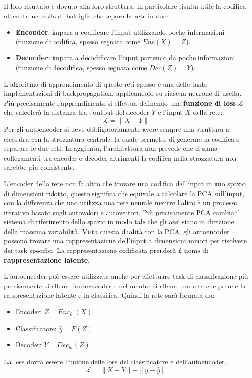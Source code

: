 Il loro risultato è dovuto alla loro struttura, in particolare risulta utile la
codifica ottenuta nel collo di bottiglia che separa la rete in due:
\begin{itemize}
      \item \textbf{Enconder}: impara a codificare l'input utilizzando poche
            informazioni (funzione di codifica, spesso segnata come $Enc(X) = Z$).
      \item \textbf{Deconder}: impara a decodificare l'input partendo da poche
            informazioni (funzione di decodifica, spesso segnata come $Dec(Z) = Y$).
\end{itemize}
L'algoritmo di apprendimento di queste reti spesso è una delle tante
implementazioni di backpropagation, applicandolo su ciascun neurone di uscita.
Più precisamente l'apprendimento si effettua definendo una \textbf{funzione di
      loss} $\mathcal{L}$ che calcolerà la distanza tra l'output del decoder $Y$
e l'input $X$ della rete:
\begin{equation}
      \mathcal{L} = \| X - Y \|
\end{equation}
Per gli autoencoder si deve obbligatoriamente avere sempre una struttura a
clessidra con la strozzatura centrale, la quale permette di generare la codifica
e separare le due reti. In aggiunta, l'architettura non prevede che ci siano
collegamenti tra encoder e decoder altrimenti la codifica nella strozzatura non
sarebbe più consistente.

L'encoder della rete non fa altro che trovare una codifica dell'input in uno
spazio di dimensioni ridotto, questo significa che equivale a calcolare la PCA
sull'input, con la differenza che uno utilizza una rete neurale mentre l'altro
è un processo iterativo basato sugli autovalori e autovettori. Più precisamente
PCA cambia il sistema di riferimento dello spazio in modo tale che gli assi
siano in direzione della massima variabilità. Vista questa dualità con la PCA,
gli autoencoder possono trovare una rappresentazione dell'input a dimensioni
minori per risolvere dei task specifici. La rappresentazione codificata prenderà
il nome di \textbf{rappresentazione latente}.

L'autoencoder può essere utilizzato anche per effettuare task di classificazione
più precisamente si allena l'autoencoder e nel mentre si allena una rete che
prende la rappresentazione latente e la classifica. Quindi la rete sarà formata
da:
\begin{itemize}
      \item Encoder: $Z = Enc_{\theta_1}(X)$
      \item Classificatore: $\hat{y} = F(Z)$
      \item Decoder: $Y = Dec_{\theta_2}(Z)$
\end{itemize}
La loss dovrà essere l'unione delle loss del classificatore e dell'autoencoder.
\begin{equation}
      \mathcal{L} = \| X - Y \| + \| y - \hat{y} \|
\end{equation}

